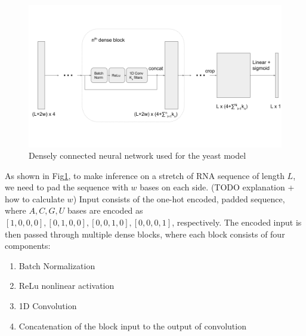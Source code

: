 \documentclass{proposal}
\begin{document}
%  

\begin{figure}
\includegraphics[width=\textwidth]{proposal_dense_net.png}
\caption{Densely connected neural network used for the yeast model}
\label{fig:dense_net}
\centering
\end{figure}

As shown in Fig\ref{fig:dense_net}, to make inference on a stretch of RNA sequence of length $L$,
we need to pad the sequence with $w$ bases on each side. (TODO explanation + how to calculate $w$)
Input consists of the one-hot encoded, padded sequence,
where $A, C, G, U$ bases are encoded as $[1, 0, 0, 0], [0, 1, 0, 0], [0, 0, 1, 0], [0, 0, 0, 1]$, respectively.
The encoded input is then passed through multiple dense blocks,
where each block consists of four components:

\begin{enumerate}
    \item Batch Normalization
    \item ReLu nonlinear activation
    \item 1D Convolution
    \item Concatenation of the block input to the output of convolution
\end{enumerate}

\end{document}

